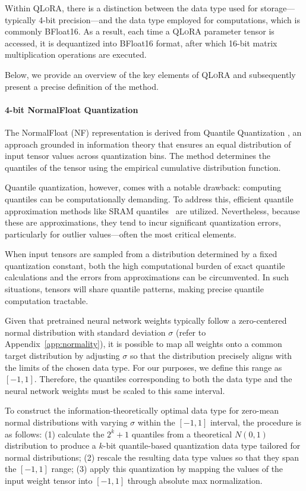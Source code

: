 Within \textsc{QLoRA}, there is a distinction between the data type used for storage—typically 4-bit precision—and the data type employed for computations, which is commonly BFloat16. As a result, each time a \textsc{QLoRA} parameter tensor is accessed, it is dequantized into BFloat16 format, after which 16-bit matrix multiplication operations are executed.

Below, we provide an overview of the key elements of \textsc{QLoRA} and subsequently present a precise definition of the method.

\paragraph{4-bit NormalFloat Quantization} The NormalFloat (NF) representation is derived from Quantile Quantization \citep{dettmers2022optimizers}, an approach grounded in information theory that ensures an equal distribution of input tensor values across quantization bins. The method determines the quantiles of the tensor using the empirical cumulative distribution function.

Quantile quantization, however, comes with a notable drawback: computing quantiles can be computationally demanding. To address this, efficient quantile approximation methods like SRAM quantiles~\citep{dettmers2022optimizers} are utilized. Nevertheless, because these are approximations, they tend to incur significant quantization errors, particularly for outlier values—often the most critical elements.

When input tensors are sampled from a distribution determined by a fixed quantization constant, both the high computational burden of exact quantile calculations and the errors from approximations can be circumvented. In such situations, tensors will share quantile patterns, making precise quantile computation tractable.

Given that pretrained neural network weights typically follow a zero-centered normal distribution with standard deviation $\sigma$ (refer to Appendix~\ref{app:normality}), it is possible to map all weights onto a common target distribution by adjusting $\sigma$ so that the distribution precisely aligns with the limits of the chosen data type. For our purposes, we define this range as $[-1, 1]$. Therefore, the quantiles corresponding to both the data type and the neural network weights must be scaled to this same interval.

To construct the information-theoretically optimal data type for zero-mean normal distributions with varying $\sigma$ within the $[-1, 1]$ interval, the procedure is as follows: (1) calculate the $2^k+1$ quantiles from a theoretical $N(0,1)$ distribution to produce a $k$-bit quantile-based quantization data type tailored for normal distributions; (2) rescale the resulting data type values so that they span the $[-1, 1]$ range; (3) apply this quantization by mapping the values of the input weight tensor into $[-1, 1]$ through absolute max normalization.

